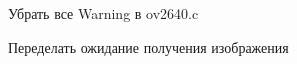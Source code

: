 \begin{DoxyRefList}
Убрать все Warning в ov2640.\+c  
\item[\label{todo__todo000011}%
\Hypertarget{todo__todo000011}%
Член \hyperlink{classunit_1_1_t_photo_a8323fa27bff29d883e9903b74c341605}{unit\+:\+:T\+Photo\+:\+:process} ()]Переделать ожидание получения изображения 
\end{DoxyRefList}